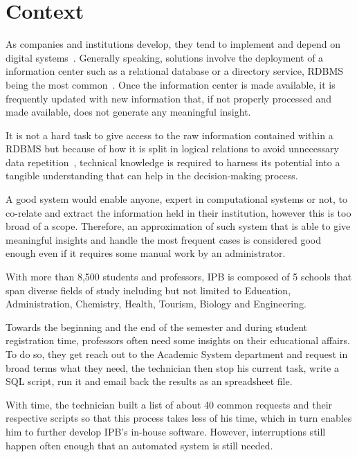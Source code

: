 \chapter{Context}\label{context}

As companies and institutions develop, they tend to implement and depend on digital systems~\cite{ibm}. Generally speaking, solutions involve the deployment of a information center such as a relational database or a directory service, \gls{RDBMS} being the most common~\cite{apachedp}. Once the information center is made available, it is frequently updated with new information that, if not properly processed and made available, does not generate any meaningful insight.

It is not a hard task to give access to the raw information contained within a \gls{RDBMS} but because of how it is split in logical relations to avoid unnecessary data repetition~\cite[Part~$\mathrm{V}$]{vaquinha}, technical knowledge is required to harness its potential into a tangible understanding that can help in the decision-making process. 

A good system would enable anyone, expert in computational systems or not, to co-relate and extract the information held in their institution, however this is too broad of a scope. Therefore, an approximation of such system that is able to give meaningful insights and handle the most frequent cases is considered good enough even if it requires some manual work by an administrator.



With more than 8,500 students and professors, \gls{IPB} is composed of 5 schools that span diverse fields of study including but not limited to Education, Administration, Chemistry, Health, Tourism, Biology and Engineering.

Towards the beginning and the end of the semester and during student registration time, professors often need some insights on their educational affairs. To do so, they get reach out to the Academic System department and request in broad terms what they need, the technician then stop his current task, write a \gls{SQL} script, run it and email back the results as an spreadsheet file.

With time, the technician built a list of about 40 common requests and their respective scripts so that this process takes less of his time, which in turn enables him to further develop \gls{IPB}'s in-house software. However, interruptions still happen often enough that an automated system is still needed.

